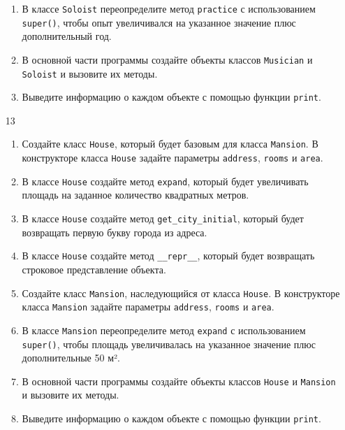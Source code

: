 \begin{enumerate}
\begin{enumerate}
    \item В классе \texttt{Soloist} переопределите метод \texttt{practice} с использованием \texttt{super()}, чтобы опыт увеличивался на указанное значение плюс дополнительный год.
    
    \item В основной части программы создайте объекты классов \texttt{Musician} и \texttt{Soloist} и вызовите их методы.
    
    \item Выведите информацию о каждом объекте с помощью функции \texttt{print}.
\end{enumerate}

\item[13] 
\begin{enumerate}
    \item Создайте класс \texttt{House}, который будет базовым для класса \texttt{Mansion}. В конструкторе класса \texttt{House} задайте параметры \texttt{address}, \texttt{rooms} и \texttt{area}.
    
    \item В классе \texttt{House} создайте метод \texttt{expand}, который будет увеличивать площадь на заданное количество квадратных метров.
    
    \item В классе \texttt{House} создайте метод \texttt{get\_city\_initial}, который будет возвращать первую букву города из адреса.
    
    \item В классе \texttt{House} создайте метод \texttt{\_\_repr\_\_}, который будет возвращать строковое представление объекта.
    
    \item Создайте класс \texttt{Mansion}, наследующийся от класса \texttt{House}. В конструкторе класса \texttt{Mansion} задайте параметры \texttt{address}, \texttt{rooms} и \texttt{area}.
    
    \item В классе \texttt{Mansion} переопределите метод \texttt{expand} с использованием \texttt{super()}, чтобы площадь увеличивалась на указанное значение плюс дополнительные 50 м².
    
    \item В основной части программы создайте объекты классов \texttt{House} и \texttt{Mansion} и вызовите их методы.
    
    \item Выведите информацию о каждом объекте с помощью функции \texttt{print}.
\end{enumerate}


\end{enumerate}
